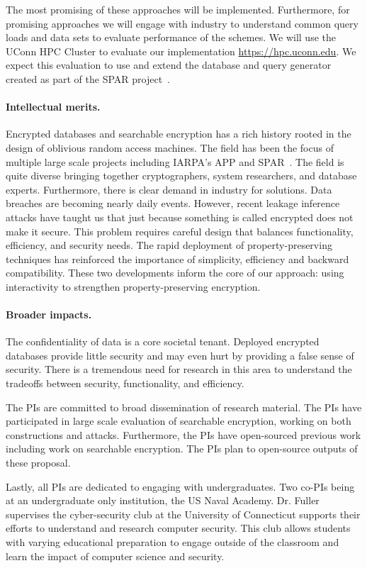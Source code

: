 The most promising of these approaches will be implemented.  Furthermore, for promising approaches we will engage with industry to understand common query loads and data sets to evaluate performance of the schemes.  We will use the UConn HPC Cluster to evaluate our implementation \url{https://hpc.uconn.edu}.  We expect this evaluation to use and extend the database and query generator created as part of the SPAR project~\cite{varia2015automated}.

\paragraph{Intellectual merits.}  
Encrypted databases and searchable encryption has a rich history rooted in the
design of oblivious random access machines.  The field has been the focus of multiple large scale projects including IARPA's APP and SPAR~\cite{spar_baa}.  The field is quite diverse bringing together cryptographers, system researchers, and database experts.  Furthermore, there is clear demand in industry for solutions.  Data breaches are becoming nearly daily events.  However, recent
leakage inference attacks have taught us that just because something is called encrypted does not make it secure.  This problem requires careful design that balances functionality, efficiency, and security needs.  The rapid deployment of property-preserving
techniques has reinforced the importance of simplicity, efficiency and backward
compatibility.  These two developments inform the core of our approach: using
interactivity to strengthen property-preserving encryption.

\paragraph{Broader impacts.}
The confidentiality of data is a core societal tenant.  Deployed encrypted
databases provide little security and may even hurt by providing a false sense
of security.  There is a tremendous need for research in this area to
understand the tradeoffs between security, functionality, and efficiency.

The PIs are committed to broad dissemination of research material.  The PIs
have participated in large scale evaluation of searchable encryption, working
on both constructions and attacks.  Furthermore, the PIs have open-sourced
previous work including work on searchable encryption.  The PIs plan to open-source outputs of these proposal.  

Lastly, all PIs are
dedicated to engaging with undergraduates. Two co-PIs being at an
undergraduate only institution, the US Naval Academy.  Dr. Fuller supervises the cyber-security club at the University of Connecticut supports their efforts to understand and research computer security.  This club allows students with varying educational preparation to engage outside of the classroom and learn the impact of computer science and security.



